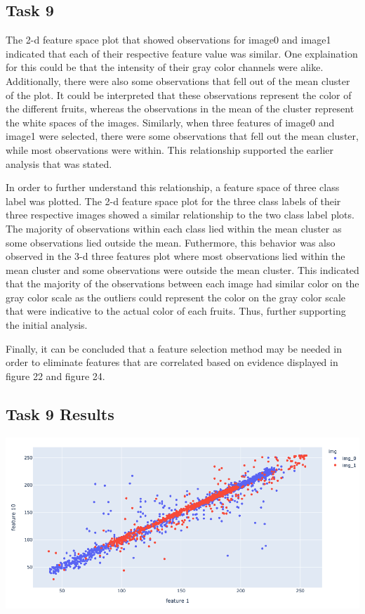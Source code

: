 \documentclass{article}
\begin{document}
\begin{multicols}{2}
	\section{Task 9}
	The 2-d feature space plot that showed 
	observations for image0 and image1 indicated 
	that each of their respective feature value was similar. 
	One explaination for this could be that the intensity 
	of their gray color channels were alike. Additionally, 
	there were also some observations that fell out of the 
	mean cluster of the plot. It could be interpreted that 
	these observations represent the color of the different 
	fruits, whereas the observations in the mean of the cluster 
	represent the white spaces of the images. Similarly, 
	when three features of image0 and image1 were selected, 
	there were some observations that fell out the mean cluster, 
	while most observations were within. This relationship supported 
	the earlier analysis that was stated. 
	
	In order to further understand this relationship, 
	a feature space of three class label was plotted. 
	The 2-d feature space plot for the three class labels 
	of their three respective images showed a similar 
	relationship to the two class label plots. 
	The majority of observations within each class 
	lied within the mean cluster as some observations 
	lied outside the mean. Futhermore, this behavior 
	was also observed in the 3-d three features plot 
	where most observations lied within the mean cluster 
	and some observations were outside the mean cluster. 
	This indicated that the majority of the observations 
	between each image had similar color on the gray color 
	scale as the outliers could represent the color on the 
	gray color scale that were indicative to the actual color 
	of each fruits. Thus, further supporting the initial analysis.
	
	Finally, it can be concluded that a feature selection method may be 
	needed in order to eliminate features that are correlated based on evidence displayed in figure 22 and figure 24. 
	
	\subsection{Task 9 Results}
	\centering
	\includegraphics[scale=0.2]{../screenshots/2d01.png}
	

\end{multicols}
\end{document}
